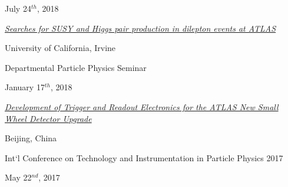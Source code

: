 \begin{minipage}{0.8\textwidth}
\begin{minipage}{\textwidth}
\begin{minipage}{0.8\textwidth}
\begin{minipage}{1.0\textwidth}
July 24$^{th}$, 2018
\end{minipage}

\vspace{0.1in}
\href{https://www.physics.uci.edu/node/13108}{\textit{Searches for SUSY and Higgs pair production in dilepton events at ATLAS}}

\vspace{0.05in}
\hspace{0.2in}
\begin{minipage}{1.0\textwidth}
University of California, Irvine

Departmental Particle Physics Seminar

January 17$^{th}$, 2018
\end{minipage}

\vspace{0.1in}
\href{https://indico.ihep.ac.cn/event/6387/session/48/contribution/122}{\textit{Development of Trigger and Readout Electronics for the ATLAS New Small Wheel Detector Upgrade}}

\vspace{0.05in}
\hspace{0.2in}
\begin{minipage}{1.0\textwidth}
Beijing, China

Int`l Conference on Technology and Instrumentation in Particle Physics 2017

May 22$^{nd}$, 2017
\end{minipage}

\end{minipage}

%
%


\end{minipage}
\end{minipage}
